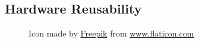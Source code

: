 \subsection{Hardware Reusability}
\label{subsec:introduction_principles_hardware_reusability}

\begin{figure} %
  \centering
  \def\stackalignment{l} %
  {\scriptsize \parbox[t]{\linewidth}{ Icon made by \href{https://www.flaticon.com/authors/freepik}{Freepik} from \href{http://www.flaticon.com}{www.flaticon.com} }}
\end{figure}

